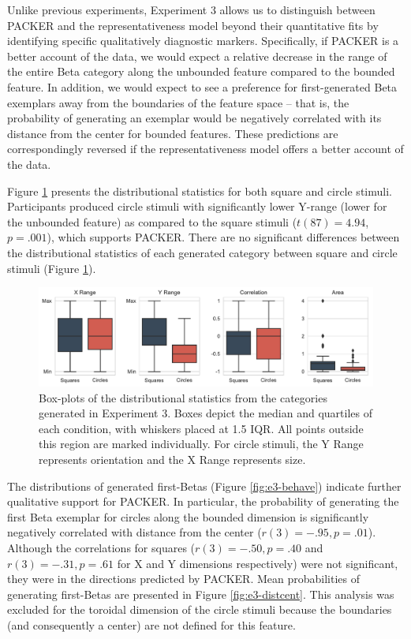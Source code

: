 \documentclass[pdflatex,sn-apa]{sn-jnl}%
\theoremstyle{thmstyleone}%
\theoremstyle{thmstyletwo}%
\theoremstyle{thmstylethree}%
\begin{document}
Unlike previous experiments, Experiment 3 allows us to distinguish between PACKER and the representativeness model
beyond their quantitative fits by identifying specific qualitatively diagnostic markers. Specifically, if PACKER is a
better account of the data, we would expect a relative decrease in the range of the entire Beta category along the
unbounded feature compared to the bounded feature. In addition, we would expect to see a preference for first-generated
Beta exemplars away from the boundaries of the feature space -- that is, the probability of generating an exemplar would
be negatively correlated with its distance from the center for bounded features. These predictions are correspondingly
reversed if the representativeness model offers a better account of the data.

Figure \ref{fig:e3-statsboxes} presents the distributional statistics for both square and circle stimuli. Participants
produced circle stimuli with significantly lower Y-range (lower for the unbounded feature) as compared to the square
stimuli ($t(87) = 4.94$, $p = .001$), which supports PACKER. There are no significant differences between the
distributional statistics of each generated category between square and circle stimuli (Figure \ref{fig:e3-statsboxes}).

\begin{figure}
    \begin{center}
      \includegraphics[width=\textwidth]{figs/e3-statsboxes.pdf}
    \caption{Box-plots of the distributional statistics from the categories
generated in Experiment 3. Boxes depict the median and quartiles of each
condition, with whiskers placed at 1.5 IQR. All points outside this region are
marked individually. For circle stimuli, the Y Range represents orientation and
the X Range represents size.}
    \label{fig:e3-statsboxes}
    \end{center}
\end{figure}

The distributions of generated first-Betas (Figure \ref{fig:e3-behave}) indicate
further qualitative support for PACKER. In particular, the probability of
generating the first Beta exemplar for circles along the bounded dimension is
significantly negatively correlated with distance from the center
($r(3) = -.95, p = .01$). Although the correlations for squares
($r(3)= -.50, p = .40$ and $r(3)= -.31, p = .61$ for X and Y dimensions
respectively) were not significant, they were in the directions predicted by
PACKER. Mean probabilities of generating first-Betas are presented in Figure
\ref{fig:e3-distcent}. This analysis was excluded for the toroidal dimension of
the circle stimuli because the boundaries (and consequently a center) are not
defined for this feature.
\end{document}
